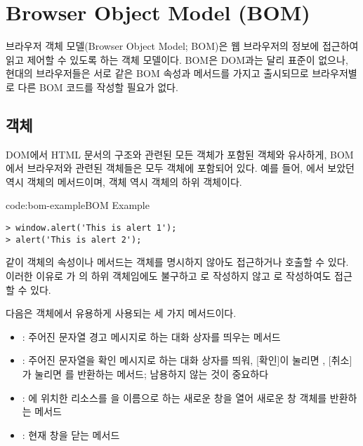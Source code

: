 \section{Browser Object Model (BOM)} \label{sect:browser-object-model}

브라우저 객체 모델(Browser Object Model; BOM)은 웹 브라우저의 정보에 접근하여 읽고 제어할 수 있도록 하는 객체 모델이다. BOM은 DOM과는 달리 표준이 없으나, 현대의 브라우저들은 서로 같은 BOM 속성과 메서드를 가지고 출시되므로 브라우저별로 다른 BOM 코드를 작성할 필요가 없다.

\subsection*{ 객체}

DOM에서 HTML 문서의 구조와 관련된 모든 객체가 포함된  객체와 유사하게, BOM에서 브라우저와 관련된 객체들은 모두  객체에 포함되어 있다. 예를 들어, 에서 보았던  역시  객체의 메서드이며,  객체 역시  객체의 하위 객체이다.

\begin{codeenv}{code:bom-example}{BOM Example}\begin{verbatim}
> window.alert('This is alert 1');
> alert('This is alert 2');
\end{verbatim}
\end{codeenv}

\과 같이  객체의 속성이나 메서드는  객체를 명시하지 않아도 접근하거나 호출할 수 있다. 이러한 이유로 가 의 하위 객체임에도 불구하고 로 작성하지 않고 로 작성하여도 접근할 수 있다.

다음은  객체에서 유용하게 사용되는 세 가지 메서드이다.

\begin{itemize}
    \item {}: 주어진 문자열 경고 메시지로 하는 대화 상자를 띄우는 메서드
    \item {}: 주어진 문자열을 확인 메시지로 하는 대화 상자를 띄워, [확인]이 눌리면 , [취소]가 눌리면 를 반환하는 메서드; 남용하지 않는 것이 중요하다
    \item {}: 에 위치한 리소스를 을 이름으로 하는 새로운 창을 열어 새로운 창 객체를 반환하는 메서드
    \item {}: 현재 창을 닫는 메서드
\end{itemize}

